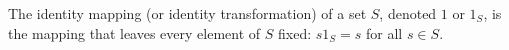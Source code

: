 The identity mapping (or identity transformation) of a set $S$, denoted $1$ or $1_S$, is the mapping that leaves every element of $S$ fixed: $s 1_S = s$ for all $s \in S$.
